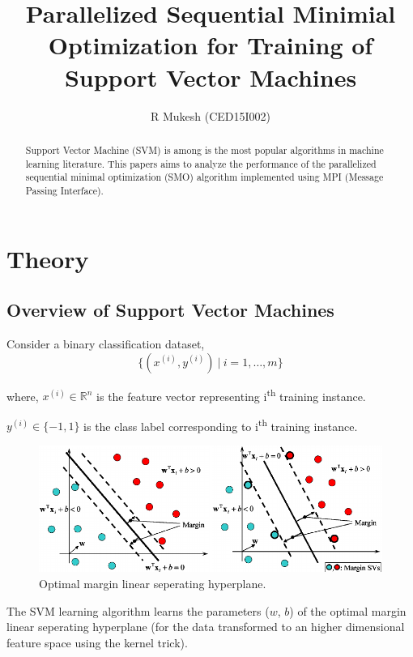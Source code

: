 \documentclass{article}
\title{Parallelized Sequential Minimial Optimization for Training of Support Vector Machines}
\author{R Mukesh (CED15I002)}
\affil{IIITDM Kancheepuram}
\date{}
\newcommand{\R}{\mathbb{R}}
\begin{document}
\maketitle

\begin{abstract}
	Support Vector Machine (SVM) is among is the most popular algorithms in machine learning literature. This papers aims to analyze the performance of the parallelized sequential minimal optimization (SMO) algorithm implemented using MPI (Message Passing Interface).
\end{abstract}

\section{Theory}

	\subsection{Overview of Support Vector Machines}
	
		Consider a binary classification dataset,
			\[
				\{(x^{(i)}, y^{(i)})\ |\ i=1, \ldots, m\}
			\]			
		
		where, 	$x^{(i)} \in \R^n$ is the feature vector representing i\textsuperscript{th} training instance.\par
		\hspace{32pt}$y^{(i)} \in \{-1, 1\}$ is the class label corresponding to i\textsuperscript{th} training instance.\par
		
		\begin{figure}[!htbp]
			\centering
			\includegraphics[scale=0.4]{svm}
			\caption{Optimal margin linear seperating hyperplane.}
		\end{figure}
		
		The SVM learning algorithm learns the parameters ($w$, $b$) of the optimal margin linear seperating hyperplane (for the data transformed to an higher dimensional feature space using the kernel trick).
		
\end{document}

